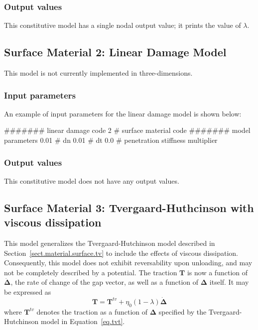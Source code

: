 \subsubsection{Output values}
This constitutive model has a single nodal output value; it prints the 
value of $\lambda$.

\subsection{Surface Material 2: Linear Damage Model}

This model is not currently implemented in three-dimensions.

\subsubsection{Input parameters}
An example of input parameters for the linear damage model is shown 
below:
\begin{inputfile}
####### linear damage code
2     # surface material code
####### model parameters
0.01  # dn
0.01  # dt
0.0   # penetration stiffness multiplier
\end{inputfile}

\subsubsection{Output values}
This constitutive model does not have any output values.

\subsection{Surface Material 3: Tvergaard-Huthcinson with viscous dissipation}
\label{sect.material.surface.tvvisc}
This model generalizes the Tvergaard-Hutchinson model 
described in Section~\ref{sect.material.surface.tv} to include the effects of 
viscous dissipation. Consequently, this model does not exhibit reversability 
upon unloading, and may not be completely described by a potential. 
The traction $\mathbf{T}$ is now a function of $\dot{\boldsymbol{\Delta}}$, 
the rate of change of the gap vector, as well as a function of $\boldsymbol{\Delta}$ itself.
It may be expressed as 
\begin{equation}
\mathbf{T} = \mathbf{T}^{tv} + \eta_0 (1-\lambda) \dot{\boldsymbol{\Delta}}
\end{equation}
where $\mathbf{T}^{tv}$ denotes the traction as a function of 
$\boldsymbol{\Delta}$ specified by
the Tvergaard-Hutchinson model in Equation~\eqref{eq.tvt}. 


